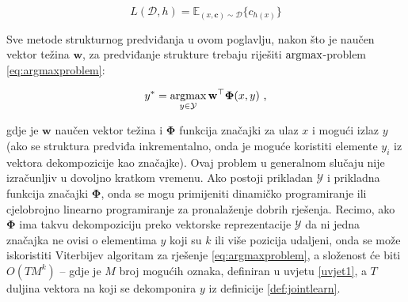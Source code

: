 \begin{equation} \label{eq:funcloss}
  L(\mathcal{D}, h) = \mathbb{E}_{(x, \mathbf{c}) \sim \mathcal{D}} \{c_{h(x)}\}
\end{equation}

\noindent
Sve metode strukturnog predviđanja u ovom poglavlju, nakon što je naučen vektor
težina $\mathbf{w}$, za predviđanje strukture trebaju riješiti $\operatorname*{argmax}$-problem
\ref{eq:argmaxproblem}:

\begin{equation}\label{eq:argmaxproblem}
  y\ssymbol{1} = \argmax_{y \in \mathcal{Y}} \mathbf{w}^\top \mathbf{\Phi}(x, y) \text{ ,}
\end{equation}

\noindent
gdje je $\mathbf{w}$ naučen vektor težina i $\mathbf{\Phi}$ funkcija značajki za
ulaz $x$ i mogući izlaz $y$ (ako se struktura predviđa inkrementalno, onda je
moguće koristiti elemente $y_i$ iz vektora dekompozicije kao značajke). Ovaj
problem u generalnom slučaju nije izračunljiv u dovoljno kratkom vremenu. Ako
postoji prikladan $\mathcal{Y}$ i prikladna funkcija značajki $\mathbf{\Phi}$,
onda se mogu primijeniti dinamičko programiranje  ili
cjelobrojno linearno programiranje  za
pronalaženje dobrih rješenja. Recimo, ako $\mathbf{\Phi}$ ima takvu
dekompoziciju preko vektorske reprezentacije $\mathcal{Y}$ da ni jedna značajka
ne ovisi o elementima $y$ koji su $k$ ili više pozicija udaljeni, onda se može
iskoristiti Viterbijev algoritam za rješenje \ref{eq:argmaxproblem}, a složenost će
biti $O(T M^k)$ -- gdje je $M$ broj mogućih oznaka, definiran u uvjetu
\ref{uvjet1}, a $T$ duljina vektora na koji se dekomponira $y$ iz definicije
\ref{def:jointlearn}.
